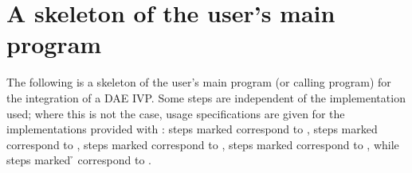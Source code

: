 \section{A skeleton of the user's main program}\label{ss:skeleton_sim}
The following is a skeleton of the user's main program (or calling
program) for the integration of a DAE IVP. Some steps are independent of the
{\nvector} implementation used; where this is not the case, usage specifications
are given for the implementations provided with {\idas}:
steps marked {\s} correspond to {\nvecs},
steps marked {\omp} correspond to {\nvecopenmp},
steps marked {\pt} correspond to {\nvecpthreads},
steps marked {\p} correspond to {\nvecp}, while
steps marked {\h} correspond to {\nvecph}.
